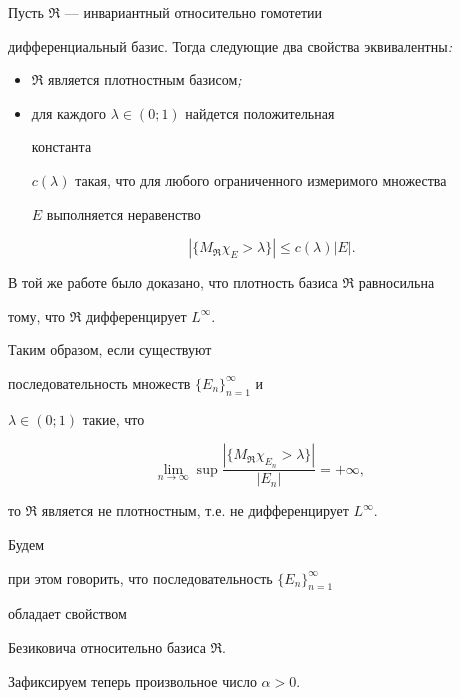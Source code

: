 \begin{thma} Пусть $\Re$ --- инвариантный относительно гомотетии 


дифференциальный базис. Тогда следующие два свойства эквивалентны{\em :} 


\begin{itemize} 


\item[(i)] $\Re$ является плотностным базисом{\em ;} 


\item[(ii)] для каждого $\lambda\in(0;1)$ найдется положительная 


константа 


$c(\lambda)$ такая, что для любого ограниченного измеримого множества 


$E$ выполняется неравенство 


$$ 


|\{M_\Re\chi_E>\lambda\}|\le c(\lambda)|E|. 


$$ 


\end{itemize} 


\end{thma} 


 


В той же работе было доказано, что плотность базиса $\Re$ равносильна 


тому, что $\Re$ дифференцирует $L^\infty$. 


Таким образом, если существуют 


последовательность множеств $\{E_n\}^\infty_{n=1}$ и 


$\lambda\in(0;1)$ такие, что 


$$ 


\lim_{n\to\infty}\sup 


\frac{|\{M_\Re\chi_{E_n}>\lambda\}|}{|E_n|}=+\infty, 


$$ 


то $\Re$ является не плотностным, т.е. не дифференцирует $L^\infty$. 


Будем 


при этом говорить, что последовательность $\{E_n\}^\infty_{n=1}$ 


обладает свойством 


Безиковича относительно базиса $\Re$. 


 


Зафиксируем теперь произвольное число $\alpha>0$. 


